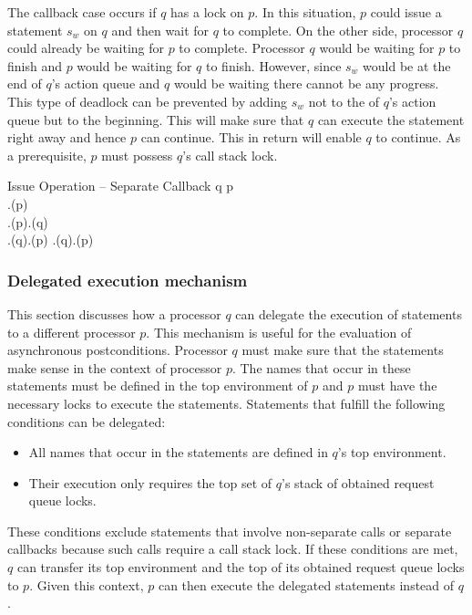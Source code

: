 The callback case occurs if $q$ has a lock on $p$. In this situation, $p$ could issue a statement $s_{w}$ on $q$ and then wait for $q$ to complete. On the other side, processor $q$ could already be waiting for $p$ to complete. Processor $q$ would be waiting for $p$ to finish and $p$ would be waiting for $q$ to finish. However, since $s_{w}$ would be at the end of $q$'s action queue and $q$ would be waiting there cannot be any progress. This type of deadlock can be prevented by adding $s_{w}$ not to the of $q$'s action queue but to the beginning. This will make sure that $q$ can execute the statement right away and hence $p$ can continue. This in return will enable $q$ to continue. As a prerequisite, $p$ must possess $q$'s call stack lock.

\singlelineinferencerule
	{Issue Operation -- Separate Callback}
	{
		q \neq p \\
		\neg \state.\arelockspassedfeature(p) \\
		\state.\callstacklocksfeature(p).\containsfeature(q) \\
		\state.\requestqueuelocksfeature(q).\containsfeature(p) \vee \state.\callstacklocksfeature(q).\containsfeature(p)
	}
	{}
	{}
 
\subsubsection{Delegated execution mechanism}
This section discusses how a processor $q$ can delegate the execution of statements to a different processor $p$. This mechanism is useful for the evaluation of asynchronous postconditions. Processor $q$ must make sure that the statements make sense in the context of processor $p$. The names that occur in these statements must be defined in the top environment of $p$ and $p$ must have the necessary locks to execute the statements. 
Statements that fulfill the following conditions can be delegated:
\begin{itemize}
	\item All names that occur in the statements are defined in $q$'s top environment.
	\item Their execution only requires the top set of $q$'s stack of obtained request queue locks.
\end{itemize}
These conditions exclude statements that involve non-separate calls or separate callbacks because such calls require a call stack lock. If these conditions are met, $q$ can transfer its top environment and the top of its obtained request queue locks to $p$. Given this context, $p$ can then execute the delegated statements instead of $q$.

